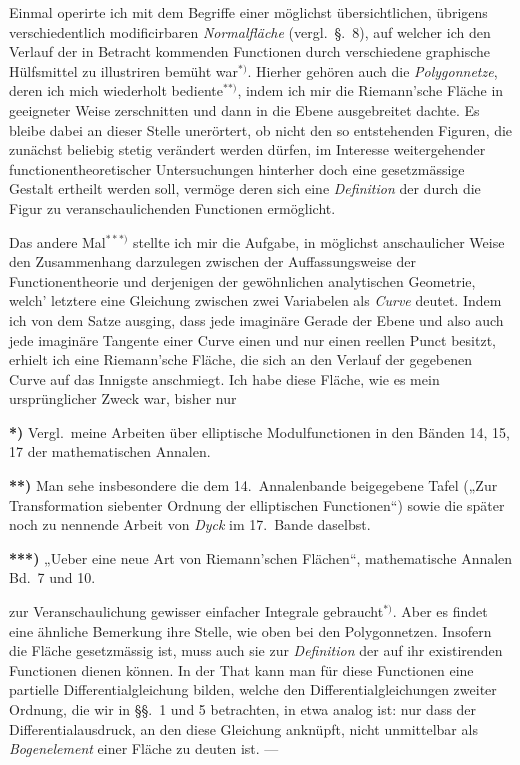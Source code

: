 \documentclass{article}
\begin{document}
Einmal operirte ich mit dem Begriffe einer möglichst übersichtlichen, übrigens verschiedentlich modificirbaren \emph{Normalfläche} (vergl.\ §.~8), auf welcher ich den Verlauf der in Betracht kommenden Functionen durch verschiedene graphische Hülfsmittel zu illustriren bemüht war${}^{*)}$. Hierher gehören auch die \emph{Polygonnetze}, deren ich mich wiederholt bediente${}^{**)}$, indem ich mir die Riemann'sche Fläche in geeigneter Weise zerschnitten und dann in die Ebene ausgebreitet dachte. Es bleibe dabei an dieser Stelle unerörtert, ob nicht den so entstehenden Figuren, die zunächst beliebig stetig verändert werden dürfen, im Interesse weitergehender functionentheoretischer Untersuchungen hinterher doch eine gesetzmässige Gestalt ertheilt werden soll, vermöge deren sich eine \emph{Definition} der durch die Figur zu veranschaulichenden Functionen ermöglicht.

Das andere Mal${}^{***)}$ stellte ich mir die Aufgabe, in möglichst anschaulicher Weise den Zusammenhang darzulegen zwischen der Auffassungsweise der Functionentheorie und derjenigen der gewöhnlichen analytischen Geometrie, welch' letztere eine Gleichung zwischen zwei Variabelen als \emph{Curve} deutet. Indem ich von dem Satze ausging, dass jede imaginäre Gerade der Ebene und also auch jede imaginäre Tangente einer Curve einen und nur einen reellen Punct besitzt, erhielt ich eine Riemann'sche Fläche, die sich an den Verlauf der gegebenen Curve auf das Innigste anschmiegt. Ich habe diese Fläche, wie es mein ursprünglicher Zweck war, bisher nur

\textbf{*)} Vergl.\ meine Arbeiten über elliptische Modulfunctionen in den Bänden 14, 15, 17 der mathematischen Annalen.

\textbf{**)} Man sehe insbesondere die dem 14.\ Annalenbande beigegebene Tafel („Zur Transformation siebenter Ordnung der elliptischen Functionen“) sowie die später noch zu nennende Arbeit von \emph{Dyck} im 17.\ Bande daselbst.

\textbf{***)} „Ueber eine neue Art von Riemann'schen Flächen“, mathematische Annalen Bd.~7 und 10.

zur Veranschaulichung gewisser einfacher Integrale gebraucht${}^{*)}$. Aber es findet eine ähnliche Bemerkung ihre Stelle, wie oben bei den Polygonnetzen. Insofern die Fläche gesetzmässig ist, muss auch sie zur \emph{Definition} der auf ihr existirenden Functionen dienen können. In der That kann man für diese Functionen eine partielle Differentialgleichung bilden, welche den Differentialgleichungen zweiter Ordnung, die wir in §§.~1 und 5 betrachten, in etwa analog ist: nur dass der Differentialausdruck, an den diese Gleichung anknüpft, nicht unmittelbar als \emph{Bogenelement} einer Fläche zu deuten ist. ---
\end{document}
